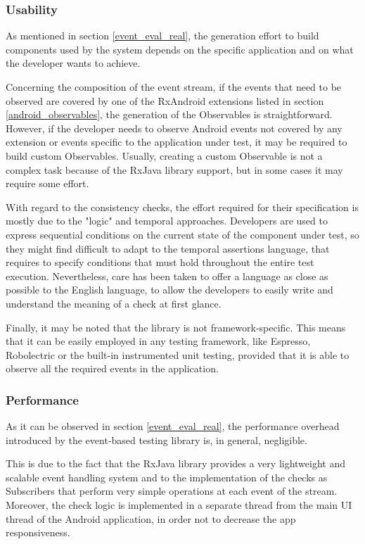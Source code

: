 \documentclass[11pt,a4paper,notitlepage]{article}
\begin{document}
\subsubsection{Usability}
As mentioned in section \ref{event_eval_real}, the generation effort to build components used by the system depends on the specific application and on what the developer wants to achieve.

Concerning the composition of the event stream, if the events that need to be observed are covered by one of the RxAndroid extensions listed in section \ref{android_observables}, the generation of the Observables is straightforward. However, if the developer needs to observe Android events not covered by any extension or events specific to the application under test, it may be required to build custom Observables. Usually, creating a custom Observable is not a complex task because of the RxJava library support, but in some cases it may require some effort.

With regard to the consistency checks, the effort required for their specification is mostly due to the "logic" and temporal approaches. Developers are used to express sequential conditions on the current state of the component under test, so they might find difficult to adapt to the temporal assertions language, that requires to specify conditions that must hold throughout the entire test execution. Nevertheless, care has been taken to offer a language as close as possible to the English language, to allow the developers to easily write and understand the meaning of a check at first glance.

Finally, it may be noted that the library is not framework-specific. This means that it can be easily employed in any testing framework, like Espresso, Robolectric or the built-in instrumented unit testing, provided that it is able to observe all the required events in the application.

\subsubsection{Performance}
As it can be observed in section \ref{event_eval_real}, the performance overhead introduced by the event-based testing library is, in general, negligible. 

This is due to the fact that the RxJava library provides a very lightweight and scalable event handling system and to the implementation of the checks as Subscribers that perform very simple operations at each event of the stream. Moreover, the check logic is implemented in a separate thread from the main UI thread of the Android application, in order not to decrease the app responsiveness.
\end{document}
